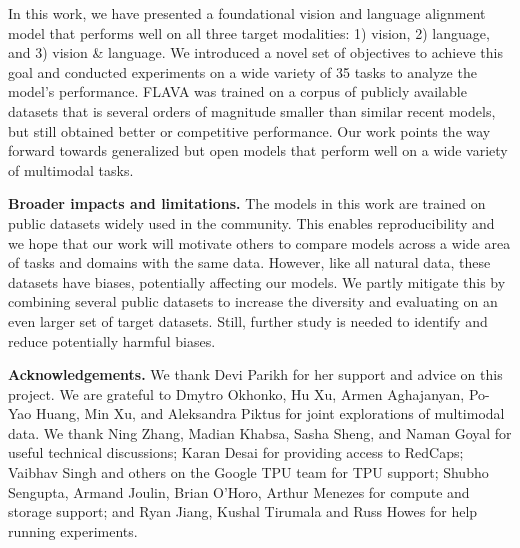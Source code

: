 \documentclass[10pt,twocolumn,letterpaper]{article}
\newcommand{\myparagraph}[1]{\vspace{0.25em}\noindent\textbf{#1}}
\begin{document}
In this work, we have presented a foundational vision and language alignment model that performs well on all three target modalities: 1) vision, 2) language, and 3) vision \& language. We introduced a novel set of objectives to achieve this goal and conducted experiments on a wide variety of 35 tasks to analyze the model's performance. FLAVA was trained on a corpus of publicly available datasets that is several orders of magnitude smaller than similar recent models, but still obtained better or competitive performance. Our work points the way forward towards generalized but open models that perform well on a wide variety of multimodal tasks.

\myparagraph{Broader impacts and limitations.} The models in this work are trained on public datasets widely used in the community. This enables reproducibility and we hope that our work will motivate others to compare models across a wide area of tasks and domains with the same data. However, like all natural data, these datasets have biases, potentially affecting our models. We partly mitigate this by combining several public datasets to increase the diversity and evaluating on an even larger set of target datasets. Still, further study is needed to identify and reduce potentially harmful biases. 

\small{\noindent\textbf{Acknowledgements.} We thank Devi Parikh for her support and advice on this project. We are grateful to Dmytro Okhonko, Hu Xu, Armen Aghajanyan, Po-Yao Huang, Min Xu, and Aleksandra Piktus for joint explorations of multimodal data. We thank Ning Zhang, Madian Khabsa, Sasha Sheng, and Naman Goyal for useful technical discussions; Karan Desai for providing access to RedCaps; Vaibhav Singh and others on the Google TPU team for TPU support; Shubho Sengupta, Armand Joulin, Brian O'Horo, Arthur Menezes for compute and storage support; and Ryan Jiang, Kushal Tirumala and Russ Howes for help running experiments.}


{\small


}
\newpage


\normalsize
\appendix

\end{document}
